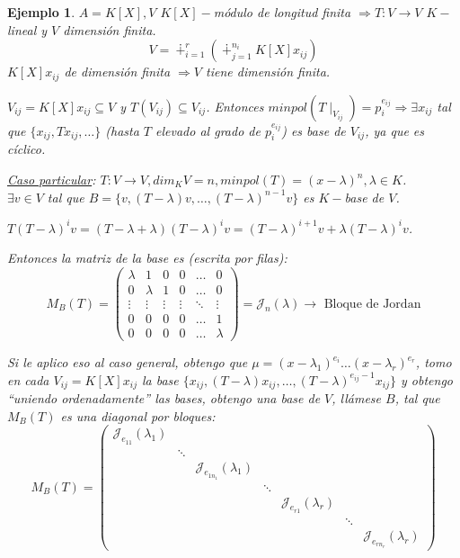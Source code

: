 \documentclass[11pt,a4paper]{article}
\theoremstyle{break}
\newtheorem{example}[theorem]{Ejemplo}
\begin{document}
\begin{example}
$A = K[X], V$ $K[X]-$módulo de longitud finita $\Rightarrow T: V \to V$ $K-$lineal y $V$ dimensión finita.
$$V = \dotplus_{i=1}^{r} (\dotplus_{j=1}^{n_{i}} K[X] x_{ij})$$
$K[X]x_{ij}$ de dimensión finita $\Rightarrow V$ tiene dimensión finita.

$V_{ij} = K[X] x_{ij} \subseteq V$ y $T(V_{ij}) \subseteq V_{ij}$. Entonces $minpol(T \mid_{V_{ij}}) = p_{i}^{e_{ij}} \Rightarrow \exists x_{ij}$ tal que $\{x_{ij}, Tx_{ij},  \dots\}$ (hasta $T$ elevado al grado de $p_{i}^{e_{ij}}$) es base de $V_{ij}$, ya que es cíclico.

\underline{Caso particular}: $T: V \to V, dim_{K}V = n, minpol(T) = (x-\lambda)^{n}, \lambda \in K$. \\
$\exists v \in V$ tal que $B = \{v, (T-\lambda)v, \dots, (T-\lambda)^{n-1}v\}$ es $K-$base de $V$.

$T(T - \lambda)^{i}v = (T - \lambda + \lambda) (T - \lambda)^{i} v = (T - \lambda)^{i+1} v + \lambda (T - \lambda)^{i}v$.

Entonces la matriz de la base es (escrita por filas):
\begin{equation*}
M_{B}(T) =
\begin{pmatrix}
\lambda & 1 & 0 & 0 & \dots & 0 \\
0 & \lambda & 1 & 0 & \dots & 0 \\
\vdots & \vdots & \vdots & \vdots & \ddots & \vdots \\
0 & 0 & 0 & 0 & \dots & 1 \\
0 & 0 & 0 & 0 & \dots 	& \lambda
\end{pmatrix}
= \mathcal{J}_{n}(\lambda) \rightarrow \text{ Bloque de Jordan}
\end{equation*}

Si le aplico eso al caso general, obtengo que $\mu = (x-\lambda_{1})^{e_{i}} \dots (x-\lambda_{r})^{e_{r}}$, tomo en cada $V_{ij} = K[X]x_{ij}$ la base $\{x_{ij}, (T-\lambda)x_{ij}, \dots, (T-\lambda)^{e_{ij}-1}x_{ij}\}$ y obtengo ``uniendo ordenadamente'' las bases, obtengo una base de $V$, llámese $B$, tal que $M_{B}(T)$ es una diagonal por bloques:
\begin{equation*}
M_{B}(T) =
\begin{pmatrix}
\mathcal{J}_{e_{11}}(\lambda_{1}) \\
 & \ddots \\
 &  & \mathcal{J}_{e_{1n_{1}}}(\lambda_{1}) & \\
 & & & \ddots \\
 & & & & \mathcal{J}_{e_{r1}}(\lambda_{r}) \\
 & & & & & \ddots \\
 & & & & & & \mathcal{J}_{e_{rn_{r}}}(\lambda_{r})
\end{pmatrix}
\end{equation*}
\end{example}
\end{document}
